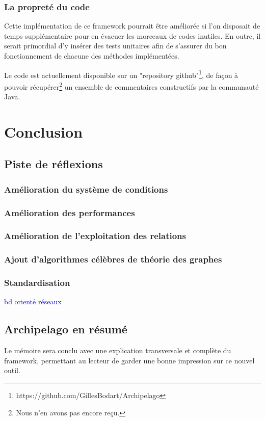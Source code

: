 \documentclass[a4paper,fleqn,12pt]{report}
\begin{document}
\subsection{La propreté du code}

Cette implémentation de ce framework pourrait être améliorée si l'on disposait de temps supplémentaire pour en évacuer les morceaux de codes inutiles. En outre, il serait primordial d'y insérer des tests unitaires afin de s'assurer du bon fonctionnement de chacune des méthodes implémentées.

Le code est actuellement disponible sur un "repository github"\footnote{https://github.com/GillesBodart/Archipelago}, de façon à pouvoir récupérer\footnote{Nous n'en avons pas encore reçu.} un ensemble de commentaires constructifs par la communauté Java. 

\chapter{Conclusion}
\section{Piste de réflexions}

\subsection{Amélioration du système de conditions}
\subsection{Amélioration des performances}
\subsection{Amélioration de l'exploitation des relations}
\subsection{Ajout d'algorithmes célèbres de théorie des graphes}
\subsection{Standardisation}
\textcolor{blue}{bd orienté réseaux}
\section{Archipelago en résumé}
Le mémoire sera conclu avec une explication transversale et complète du framework, permettant au lecteur de garder une bonne impression sur ce nouvel outil. 
\end{document}
